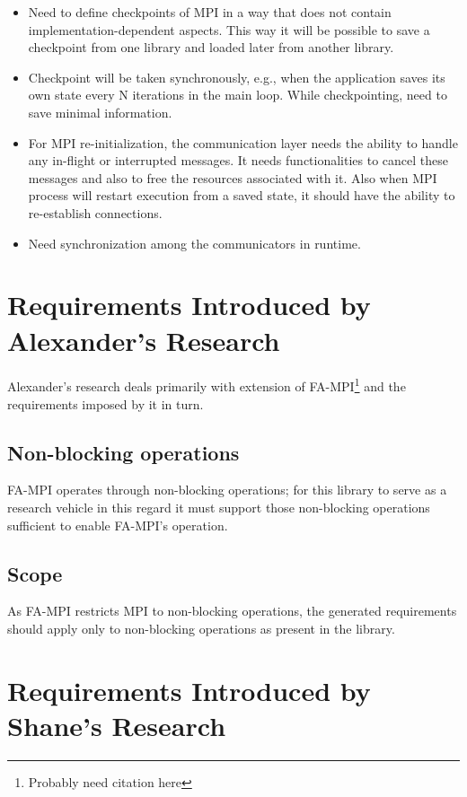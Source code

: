 \documentclass{article}
\begin{document}
\begin{itemize}
\item Need to define checkpoints of MPI in a way that does not contain implementation-dependent aspects.  This way it will be possible to save a checkpoint from one library and loaded later from another library.
\item Checkpoint will be taken synchronously, e.g., when the application saves its own state every N iterations in the main loop. While checkpointing, need to save minimal information.
\item 	For MPI re-initialization, the communication layer needs the ability to handle any in-flight or interrupted messages.  It needs functionalities to cancel these messages and also to free the resources associated with it.  Also when MPI process will restart execution from a saved state, it should have the ability to re-establish connections.
\item Need synchronization among the communicators in runtime.
\end{itemize}


\section{Requirements Introduced by Alexander's Research}

Alexander's research deals primarily with extension of FA-MPI\footnote{Probably need citation here} and the requirements imposed by it in turn.  

\subsection{Non-blocking operations}

FA-MPI operates through non-blocking operations; for this library to serve as a research vehicle in this regard it must support those non-blocking operations sufficient to enable FA-MPI's operation.

\subsection{Scope}  

As FA-MPI restricts MPI to non-blocking operations, the generated requirements should apply only to non-blocking operations as present in the library.



\section{Requirements Introduced by Shane's Research}
\end{document}
